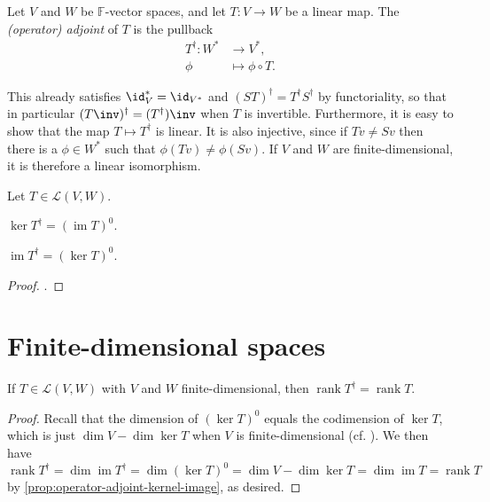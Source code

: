 \documentclass[article, a4paper, 11pt, oneside]{memoir}
\numberwithin{equation}{chapter}
\newcommand{\calL}{\mathcal{L}}
\newcommand{\field}{\mathbb{F}}
\begin{document}
\begin{definition}
    Let $V$ and $W$ be $\field$-vector spaces, and let $T \colon V \to W$ be a linear map. The \emph{(operator) adjoint} of $T$ is the pullback
    \begin{align*}
        T^\dagger \colon W^* &\to V^*, \\
        \phi &\mapsto \phi \circ T.
    \end{align*}
\end{definition}
%
This already satisfies $\id_V^* = \id_{V^*}$ and $(ST)^\dagger = T^\dagger S^\dagger$ by functoriality, so that in particular $(T\inv)^\dagger = (T^\dagger)\inv$ when $T$ is invertible. Furthermore, it is easy to show that the map $T \mapsto T^\dagger$ is linear. It is also injective, since if $Tv \neq Sv$ then there is a $\phi \in W^*$ such that $\phi(Tv) \neq \phi(Sv)$. If $V$ and $W$ are finite-dimensional, it is therefore a linear isomorphism.

\newcommand{\im}{\operatorname{im}}

\begin{proposition}
    \label{prop:operator-adjoint-kernel-image}
    Let $T \in \calL(V,W)$.
    \begin{enumprop}
        \item $\ker T^\dagger = (\im T)^0$.
        \item $\im T^\dagger = (\ker T)^0$.
    \end{enumprop}
\end{proposition}

\begin{proof}
    \textcite[Theorem~3.19]{romanlinalg}.
\end{proof}


\section{Finite-dimensional spaces}

\newcommand{\rank}{\operatorname{rank}}

\begin{corollary}
    \label{cor:adjoint-rank}
    If $T \in \calL(V,W)$ with $V$ and $W$ finite-dimensional, then $\rank T^\dagger = \rank T$.
\end{corollary}

\begin{proof}
    Recall that the dimension of $(\ker T)^0$ equals the codimension of $\ker T$, which is just $\dim V - \dim \ker T$ when $V$ is finite-dimensional (cf. \cite[Theorem~3.15]{romanlinalg}). We then have
    \begin{equation*}
        \rank T^\dagger
            = \dim \im T^\dagger
            = \dim (\ker T)^0
            = \dim V - \dim \ker T
            = \dim \im T
            = \rank T
    \end{equation*}
    by \cref{prop:operator-adjoint-kernel-image}, as desired.
\end{proof}
\end{document}
